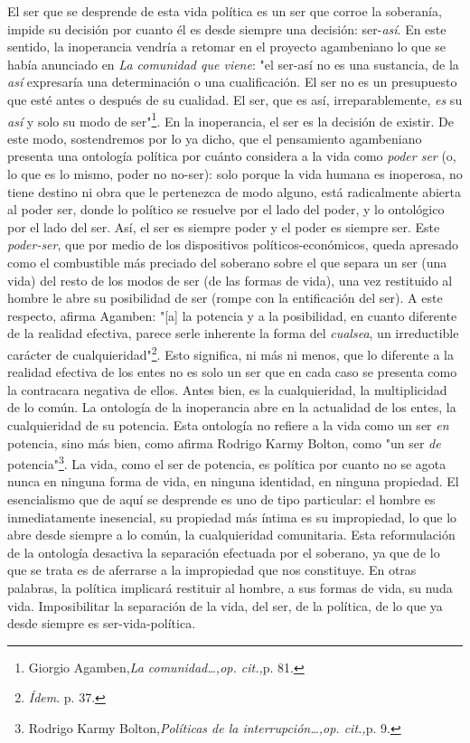 El ser que se desprende de esta vida política es un ser que corroe la
soberanía, impide su decisión por cuanto él es desde siempre una
decisión: ser-\emph{así}. En este sentido, la inoperancia vendría a
retomar en el proyecto agambeniano lo que se había anunciado en \emph{La
comunidad que viene}: "el ser-así no es una sustancia, de la \emph{así}
expresaría una determinación o una cualificación. El ser no es un
presupuesto que esté antes o después de su cualidad. El ser, que es así,
irreparablemente, \emph{es} su \emph{así} y solo su modo de
ser"\footnote{Giorgio Agamben,\emph{La comunidad\ldots,op. cit.,}p. 81.}.
En la inoperancia, el ser es la decisión de existir. De este modo,
sostendremos por lo ya dicho, que el pensamiento agambeniano presenta
una ontología política por cuánto considera a la vida como \emph{poder
ser} (o, lo que es lo mismo, poder no no-ser): solo porque la vida
humana es inoperosa, no tiene destino ni obra que le pertenezca de modo
alguno, está radicalmente abierta al poder ser, donde lo político se
resuelve por el lado del poder, y lo ontológico por el lado del ser.
Así, el ser es siempre poder y el poder es siempre ser. Este
\emph{poder-ser}, que por medio de los dispositivos
políticos-económicos, queda apresado como el combustible más preciado
del soberano sobre el que separa un ser (una vida) del resto de los
modos de ser (de las formas de vida), una vez restituido al hombre le
abre su posibilidad de ser (rompe con la entificación del ser). A este
respecto, afirma Agamben: "{[}a{]} la potencia y a la posibilidad, en
cuanto diferente de la realidad efectiva, parece serle inherente la
forma del \emph{cualsea}, un irreductible carácter de
cualquieridad"\footnote{\emph{Ídem}. p. 37.}. Esto significa, ni más ni
menos, que lo diferente a la realidad efectiva de los entes no es solo
un ser que en cada caso se presenta como la contracara negativa de
ellos. Antes bien, es la cualquieridad, la multiplicidad de lo común. La
ontología de la inoperancia abre en la actualidad de los entes, la
cualquieridad de su potencia. Esta ontología no refiere a la vida como
un ser \emph{en} potencia, sino más bien, como afirma Rodrigo Karmy
Bolton, como "un ser \emph{de} potencia"\footnote{Rodrigo Karmy
  Bolton,\emph{Políticas de la interrupción\ldots,op. cit.,}p. 9.}. La
vida, como el ser de potencia, es política por cuanto no se agota nunca
en ninguna forma de vida, en ninguna identidad, en ninguna propiedad. El
esencialismo que de aquí se desprende es uno de tipo particular: el
hombre es inmediatamente inesencial, su propiedad más íntima es su
impropiedad, lo que lo abre desde siempre a lo común, la cualquieridad
comunitaria. Esta reformulación de la ontología desactiva la separación
efectuada por el soberano, ya que de lo que se trata es de aferrarse a
la impropiedad que nos constituye. En otras palabras, la política
implicará restituir al hombre, a sus formas de vida, su nuda vida.
Imposibilitar la separación de la vida, del ser, de la política, de lo
que ya desde siempre es ser-vida-política.


